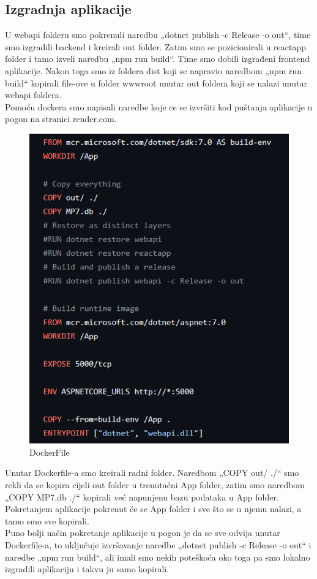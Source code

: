 			\subsection{Izgradnja aplikacije}
				U webapi folderu smo pokrenuli naredbu „dotnet publish -c Release -o out“, time smo izgradili backend i kreirali out folder. Zatim smo se pozicionirali u reactapp folder i tamo izveli naredbu „npm run build“. Time smo dobili izgrađeni frontend aplikacije. Nakon toga smo iz foldera dist koji se napravio naredbom „npm run build“ kopirali file-ove u folder wwwroot unutar out foldera koji se nalazi unutar webapi foldera.\\
				Pomoću dockera smo napisali naredbe koje ce se izvršiti kod puštanja aplikacije u pogon na stranici render.com.
				\begin{figure}[H]
					\includegraphics[width=\textwidth]{pp1.PNG}
					\centering
					\caption{DockerFile}
					\label{fig:dockerfile}
				\end{figure}
				Unutar Dockerfile-a smo kreirali radni folder. Naredbom „COPY out/ ./“ smo rekli da se kopira cijeli out folder u trenutačni App folder, zatim smo naredbom „COPY MP7.db ./“ kopirali već napunjenu bazu podataka u App folder.\\
				Pokretanjem aplikacije pokrenut će se App folder i sve što se u njemu nalazi, a tamo smo sve kopirali.\\
				Puno bolji način pokretanje aplikacije u pogon je da se sve odvija unutar Dockerfile-a, to uključuje izvršavanje naredbe „dotnet publish -c Release -o out“ i naredbe „npm run build“, ali imali smo nekih poteškoća oko toga pa smo lokalno izgradili aplikaciju i takvu ju samo kopirali.
				
